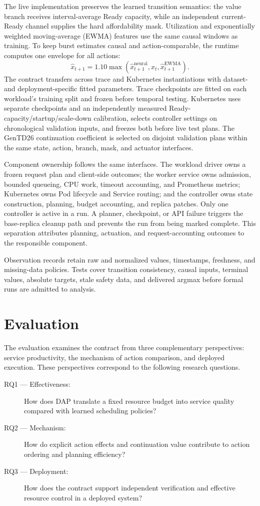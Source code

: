 \documentclass[acmsmall,screen,review,anonymous]{acmart}
\begin{document}
The live implementation preserves the learned transition semantics: the value
branch receives interval-average Ready capacity, while an independent current-
Ready channel supplies the hard affordability mask. Utilization and
exponentially weighted moving-average (EWMA)
features use the same causal windows as training.  To keep burst estimates
causal and action-comparable, the runtime computes one envelope for all actions:
\[
\widehat x_{t+1}=1.10\max\!\left(
\widehat x^{\mathrm{neural}}_{t+1},x_t,
\widehat x^{\mathrm{EWMA}}_{t+1}\right).
\]
The contract transfers across trace and Kubernetes instantiations with
dataset- and deployment-specific fitted parameters.  Trace checkpoints are fitted on each workload's training split
and frozen before temporal testing.  Kubernetes uses separate checkpoints and
an independently measured Ready-capacity/startup/scale-down calibration,
selects controller settings on chronological validation inputs, and freezes
both before live test plans.  The GenTD26 continuation coefficient is selected on disjoint validation
plans within the same state, action, branch, mask, and actuator interfaces.

Component ownership follows the same interfaces.  The workload driver
owns a frozen request plan and client-side outcomes; the worker service owns
admission, bounded queueing, CPU work, timeout accounting, and Prometheus
metrics; Kubernetes owns Pod lifecycle and Service routing; and the controller
owns state construction, planning, budget accounting, and replica patches.
Only one controller is active in a run.  A planner, checkpoint, or API failure
triggers the base-replica cleanup path and prevents the run from being marked
complete.  This separation attributes planning, actuation, and request-accounting
outcomes to the responsible component.

Observation records retain raw and normalized values, timestamps, freshness,
and missing-data policies. Tests cover transition consistency, causal inputs,
terminal values, absolute targets, stale safety data, and delivered argmax
before formal runs are admitted to analysis.

\section{Evaluation}
\label{sec:evaluation}

The evaluation examines the contract from three complementary perspectives:
service productivity, the mechanism of action comparison, and deployed
execution. These perspectives correspond to the following research questions.
\begin{description}
  \item[RQ1 --- Effectiveness:] How does DAP translate a fixed resource budget
  into service quality compared with learned scheduling policies?
  \item[RQ2 --- Mechanism:] How do explicit action effects and continuation
  value contribute to action ordering and planning efficiency?
  \item[RQ3 --- Deployment:] How does the contract support independent
  verification and effective resource control in a deployed system?
\end{description}
\end{document}
